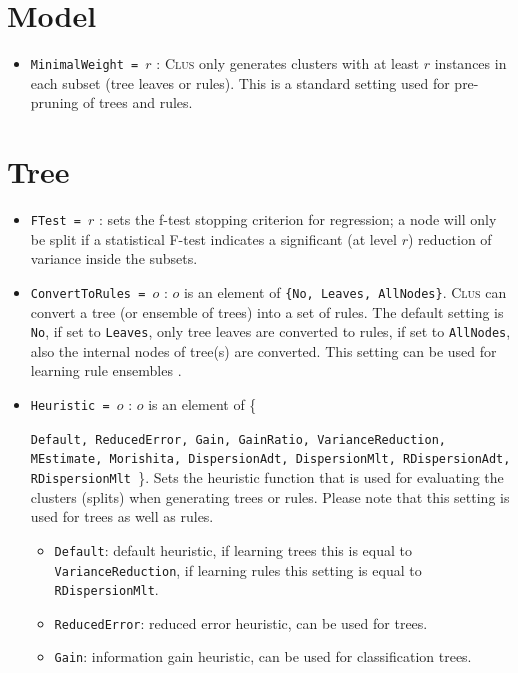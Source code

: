 \documentclass[a4paper]{report}
\newcommand{\clus}{\textsc{Clus}}
\begin{document}
\section{Model}

\begin{itemize}
\item {\tt MinimalWeight = $r$} : \clus{} only generates clusters with at least $r$ instances in each subset (tree leaves or rules). This is a standard setting used for pre-pruning of trees and rules.
\end{itemize}

\section{Tree}

\begin{itemize}
	\item {\tt FTest = $r$} : sets the f-test stopping criterion for regression; a node will only be split if a statistical F-test indicates a significant (at level $r$) reduction of variance inside the subsets.
	\item {\tt ConvertToRules = $o$} : $o$ is an element of \texttt{\{No, Leaves, AllNodes\}}. \clus{} can convert a tree (or ensemble of trees) into a set of rules. The default setting is \texttt{No}, if set to \texttt{Leaves}, only tree leaves are converted to rules, if set to \texttt{AllNodes}, also the internal nodes of tree(s) are converted. This setting can be used for learning rule ensembles \cite{Aho2009}.
	\item \texttt{Heuristic = $o$} : $o$ is an element of \{\raggedright\texttt{Default, ReducedError, Gain, GainRatio, %
	VarianceReduction, MEstimate, Morishita, DispersionAdt, DispersionMlt, RDispersionAdt, RDispersionMlt%
	}\}. Sets the heuristic function that is used for evaluating the clusters (splits) when generating trees or rules. Please note that this setting is used for trees as well as rules.
%	
	\begin{itemize}
		\item \texttt{Default}: default heuristic, if learning trees this is equal to \texttt{VarianceReduction}, if learning rules this setting is equal to \texttt{RDispersionMlt}.
		\item \texttt{ReducedError}: reduced error heuristic, can be used for trees.
		\item \texttt{Gain}: information gain heuristic, can be used for classification trees.

\end{itemize}
\end{itemize}
\end{document}
